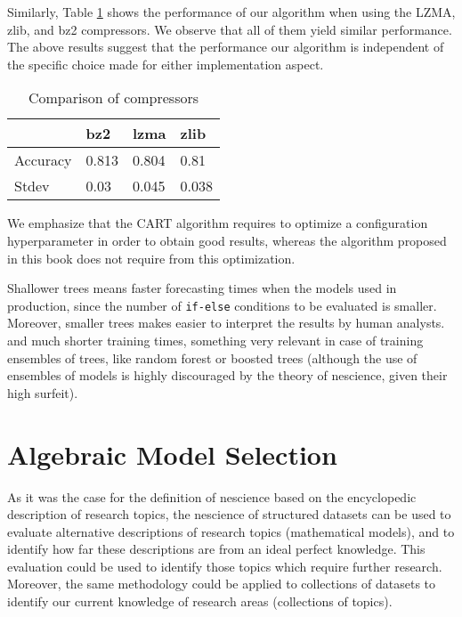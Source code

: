 Similarly, Table \ref{table:compressor} shows the performance of our algorithm when using the LZMA, zlib, and bz2 compressors. We observe that all of them yield similar performance. The above results suggest that the performance our algorithm is independent of the specific choice made for either implementation aspect.

\begin{table}[h]
\label{table:compressor}
\centering
\begin{tabular}{l l l l}
\toprule
 & \textbf{bz2} & \textbf{lzma} & \textbf{zlib} \\
\midrule
Accuracy & 0.813 & 0.804 & 0.81 \\
Stdev & 0.03 & 0.045 & 0.038 \\
\bottomrule
\end{tabular}
\caption{Comparison of compressors}
\end{table}

We emphasize that the CART algorithm requires to optimize a configuration hyperparameter in order to obtain good results, whereas the algorithm proposed in this book does not require from this optimization.

Shallower trees means faster forecasting times when the models used in production, since the number of \texttt{if-else} conditions to be evaluated is smaller. Moreover, smaller trees makes easier to interpret the results by human analysts. and much shorter training times, something very relevant in case of training ensembles of trees, like random forest or boosted trees (although the use of ensembles of models is highly discouraged by the theory of nescience, given their high surfeit).

%
%

\section{Algebraic Model Selection}

As it was the case for the definition of nescience based on the encyclopedic description of research topics, the nescience of structured datasets can be used to evaluate alternative descriptions of research topics (mathematical models), and to identify how far these descriptions are from an ideal perfect knowledge. This evaluation could be used to identify those topics which require further research. Moreover, the same methodology could be applied to collections of datasets to identify our current knowledge of research areas (collections of topics).

